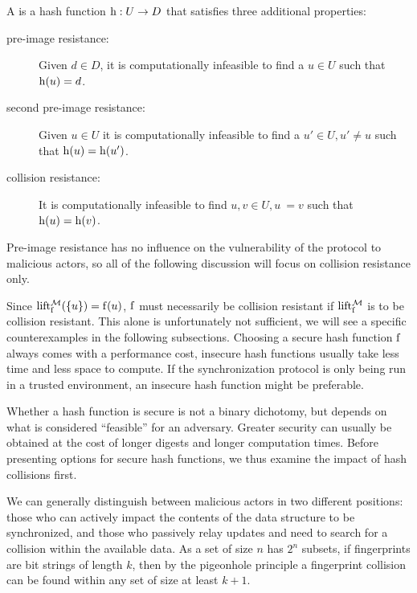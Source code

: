 \begin{definition}
A  is a hash function ${\operatorname{h}}: {U} \rightarrow {D}$ that satisfies three additional properties:

\begin{description}
  \item[pre-image resistance:] Given $d \in D$, it is computationally infeasible to find a $u \in U$ such that $\operatorname{h}(u) = d$.
  \item[second pre-image resistance:] Given $u \in U$ it is computationally infeasible to find a $u' \in U, u' \neq u$ such that $\operatorname{h}(u) = \operatorname{h}(u')$.
  \item[collision resistance:] It is computationally infeasible to find $u, v \in U, u ~= v$ such that $\operatorname{h}(u) = \operatorname{h}(v)$.
\end{description}
\end{definition}

Pre-image resistance has no influence on the vulnerability of the protocol to malicious actors, so all of the following discussion will focus on collision resistance only.

Since $\operatorname{lift_{\operatorname{f}}^{\mathcal{M}}}(\{u\}) = \operatorname{f}(u)$, $\operatorname{f}$ must necessarily be collision resistant if $\operatorname{lift_{\operatorname{f}}^{\mathcal{M}}}$ is to be collision resistant. This alone is unfortunately not sufficient, we will see a specific counterexamples in the following subsections. Choosing a secure hash function $\operatorname{f}$ always comes with a performance cost, insecure hash functions usually take less time and less space to compute. If the synchronization protocol is only being run in a trusted environment, an insecure hash function might be preferable.

Whether a hash function is secure is not a binary dichotomy, but depends on what is considered ``feasible'' for an adversary. Greater security can usually be obtained at the cost of longer digests and longer computation times. Before presenting options for secure hash functions, we thus examine the impact of hash collisions first.

We can generally distinguish between malicious actors in two different positions: those who can actively impact the contents of the data structure to be synchronized, and those who passively relay updates and need to search for a collision within the available data. As a set of size $n$ has $2^n$ subsets, if fingerprints are bit strings of length $k$, then by the pigeonhole principle a fingerprint collision can be found within any set of size at least $k + 1$.

